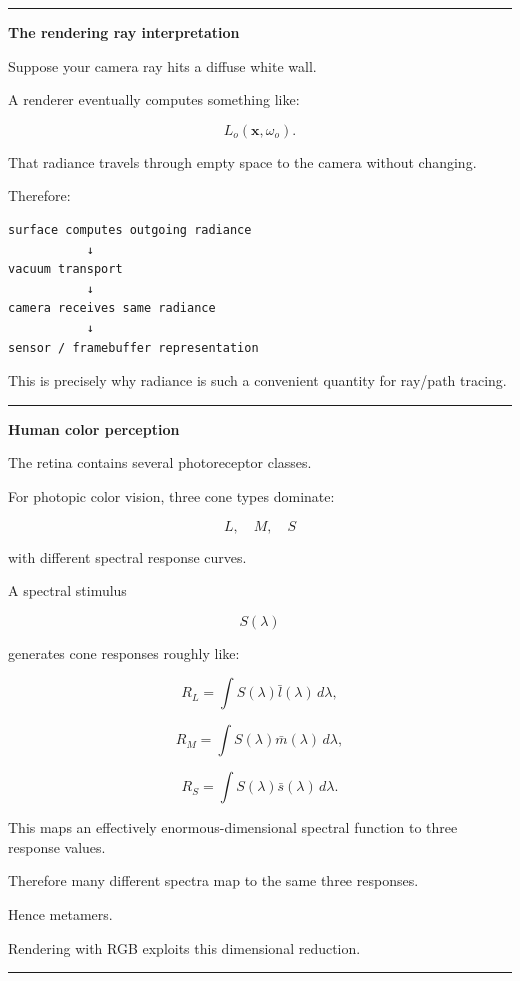 \begin{center}\rule{0.5\linewidth}{0.5pt}\end{center}

\textbf{The rendering ray interpretation}

Suppose your camera ray hits a diffuse white wall.

A renderer eventually computes something like:

\[
L_o(\mathbf x,\omega_o).
\]

That radiance travels through empty space to the camera without changing.

Therefore:

\begin{verbatim}
surface computes outgoing radiance
           ↓
vacuum transport
           ↓
camera receives same radiance
           ↓
sensor / framebuffer representation
\end{verbatim}

This is precisely why radiance is such a convenient quantity for ray/path tracing.

\begin{center}\rule{0.5\linewidth}{0.5pt}\end{center}

\textbf{Human color perception}

The retina contains several photoreceptor classes.

For photopic color vision, three cone types dominate:

\[
L,\quad M,\quad S
\]

with different spectral response curves.

A spectral stimulus

\[
S(\lambda)
\]

generates cone responses roughly like:

\[
R_L=
\int S(\lambda)\bar l(\lambda)\,d\lambda,
\]

\[
R_M=
\int S(\lambda)\bar m(\lambda)\,d\lambda,
\]

\[
R_S=
\int S(\lambda)\bar s(\lambda)\,d\lambda.
\]

This maps an effectively enormous-dimensional spectral function to three response values.

Therefore many different spectra map to the same three responses.

Hence metamers.

Rendering with RGB exploits this dimensional reduction.

\begin{center}\rule{0.5\linewidth}{0.5pt}\end{center}

